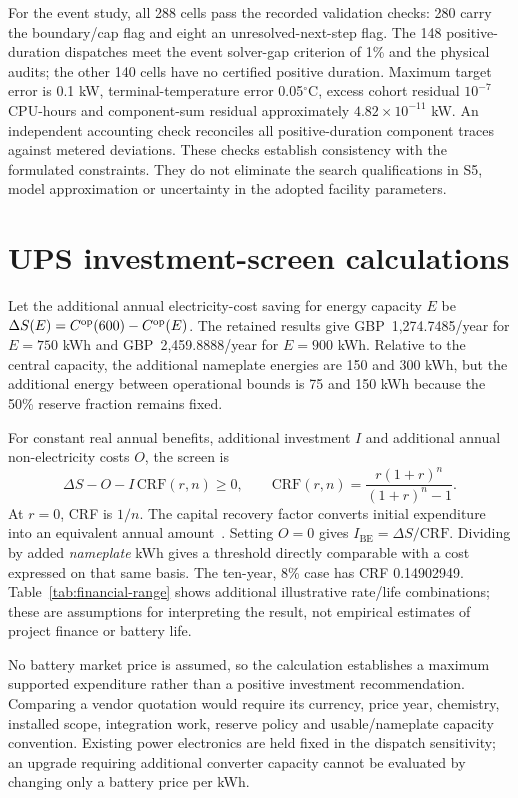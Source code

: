 For the event study, all 288 cells pass the recorded validation checks: 280 carry the boundary/cap flag and eight an unresolved-next-step flag. The 148 positive-duration dispatches meet the event solver-gap criterion of 1\% and the physical audits; the other 140 cells have no certified positive duration. Maximum target error is 0.1 kW, terminal-temperature error 0.05$^{\circ}$C, excess cohort residual $10^{-7}$ CPU-hours and component-sum residual approximately $4.82\times10^{-11}$ kW. An independent accounting check reconciles all positive-duration component traces against metered deviations. These checks establish consistency with the formulated constraints. They do not eliminate the search qualifications in S5, model approximation or uncertainty in the adopted facility parameters.

\section{UPS investment-screen calculations}
Let the additional annual electricity-cost saving for energy capacity $E$ be $\Delta S(E)=C^{\mathrm{op}}(600)-C^{\mathrm{op}}(E)$. The retained results give GBP~1,274.7485/year for $E=750$ kWh and GBP~2,459.8888/year for $E=900$ kWh. Relative to the central capacity, the additional nameplate energies are 150 and 300 kWh, but the additional energy between operational bounds is 75 and 150 kWh because the 50\% reserve fraction remains fixed.

For constant real annual benefits, additional investment $I$ and additional annual non-electricity costs $O$, the screen is
\begin{equation}
\Delta S-O-I\,\mathrm{CRF}(r,n)\geq0,\qquad
\mathrm{CRF}(r,n)=\frac{r(1+r)^n}{(1+r)^n-1}.
\end{equation}
At $r=0$, CRF is $1/n$. The capital recovery factor converts initial expenditure into an equivalent annual amount~\cite{sam_crf}. Setting $O=0$ gives $I_{\mathrm{BE}}=\Delta S/\mathrm{CRF}$. Dividing by added \emph{nameplate} kWh gives a threshold directly comparable with a cost expressed on that same basis. The ten-year, 8\% case has CRF 0.14902949. Table~\ref{tab:financial-range} shows additional illustrative rate/life combinations; these are assumptions for interpreting the result, not empirical estimates of project finance or battery life.



No battery market price is assumed, so the calculation establishes a maximum supported expenditure rather than a positive investment recommendation. Comparing a vendor quotation would require its currency, price year, chemistry, installed scope, integration work, reserve policy and usable/nameplate capacity convention. Existing power electronics are held fixed in the dispatch sensitivity; an upgrade requiring additional converter capacity cannot be evaluated by changing only a battery price per kWh.

